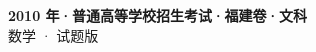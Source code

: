\documentclass[zihao=-4, a4paper]{ctexart}
\begin{document}
\begin{center}
  {\Large\bfseries 2010 年·普通高等学校招生考试·福建卷·文科}\\[4pt]
  {\large 数学 · 试题版}
\end{center}
\medskip
{}

\end{document}
